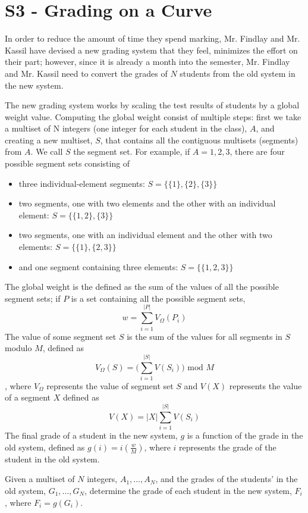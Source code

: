 \section*{S3 - Grading on a Curve}
In order to reduce the amount of time they spend marking, Mr. Findlay and Mr. Kassil have devised a new grading system that they feel, minimizes the effort on their part; however, since it is already a month into the semester, Mr. Findlay and Mr. Kassil need to convert the grades of $N$ students from the old system in the new system.

The new grading system works by scaling the test results of students by a global weight value. Computing the global weight consist of multiple steps: first we take a multiset of N integers (one integer for each student in the class), $A$, and creating a new multiset, $S$, that contains all the contiguous multisets (segments) from $A$. We call $S$ the segment set. For example, if $A = {1,2,3}$, there are four possible segment sets consisting of

\begin{itemize}
    \item three individual-element segments: $S = \{\{1\}, \{2 \}, \{3\}\}$
    \item two segments, one with two elements and the other with an individual element: $S = \{\{1,2\}, \{3\}\}$
    \item two segments, one with an individual element and the other with two elements: $S = \{\{1\},\{2,3\}\}$
    \item and one segment containing three elements: $S = \{\{1, 2, 3\}\}$
\end{itemize}

The global weight is the defined as the sum of the values of all the possible segment sets; if $P$ is a set containing all the possible segment sets, $$w = \sum_{i = 1}^{|P|} V_{\Omega}(P_i)$$ The value of some segment set $S$ is the sum of the values for all segments in $S$ modulo $M$, defined as $$V_{\Omega}(S) = \Big(\sum_{i = 1}^{|S|} V(S_i) \Big) \text{ mod } M$$, where $V_{\Omega}$ represents the value of segment set $S$ and $V(X)$ represents the value of a segment $X$ defined as $$V(X) = |X|\sum_{i = 1}^{|S|} V(S_i)$$ The final grade of a student in the new system, $g$ is a function of the grade in the old system, defined as $g(i) = i(\frac{w}{M})$, where $i$ represents the grade of the student in the old system.

Given a multiset of $N$ integers, $A_1, \dots, A_N$, and the grades of the students' in the old system, $G_1, \dots, G_N$, determine the grade of each student in the new system, $F_i$, where $F_i = g(G_i)$.

